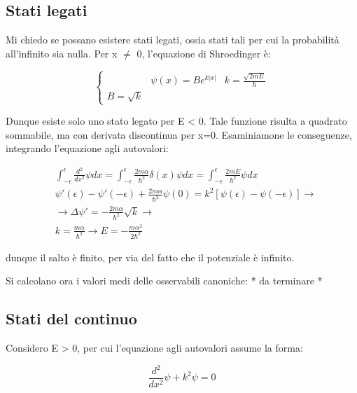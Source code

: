 \documentclass{report}
\begin{document}
\subsection[short]{Stati legati}
Mi chiedo se possano esistere stati legati, ossia stati tali per cui la probabilità all'infinito sia nulla.
Per x $\neq$ 0, l'equazione di Shroedinger è:

\begin{equation}
  \left\{
  \begin{aligned}
     & \psi(x)=Be^{k|x|}
     & k=\frac{\sqrt{2mE}}{\hbar}
    \\ B= \sqrt{k}
  \end{aligned}
  \right.
\end{equation}

Dunque esiste solo uno stato legato per E < 0.
Tale funzione risulta a quadrato sommabile, ma con derivata discontinua per x=0. Esaminiamone le conseguenze, integrando
l'equazione agli autovalori:

\begin{equation}
  \begin{aligned}
     & \int_{-\epsilon}^{\epsilon} \frac{d^2}{dx^2} \psi dx = \int_{-\epsilon}^{\epsilon}\frac{2m\alpha}{\hbar^2}\delta(x)\psi dx= \int_{-\epsilon}^{\epsilon} \frac{2mE}{\hbar^2}\psi dx \\
     & \psi'(\epsilon)-\psi'(-\epsilon)+\frac{2m\alpha}{\hbar^2}\psi(0)=k^2[\psi(\epsilon)- \psi(-\epsilon)] \rightarrow                                                                  \\
     & \rightarrow \Delta \psi'= -\frac{2m\alpha}{\hbar^2}\sqrt{k} \rightarrow                                                                                                            \\
     & k= \frac{m\alpha}{\hbar^2} \rightarrow E=-\frac{m\alpha^2}{2\hbar^2}
  \end{aligned}
\end{equation}

dunque il salto è finito, per via del fatto che il potenziale è infinito.

Si calcolano ora i valori medi delle osservabili canoniche: * da terminare *

\subsection{Stati del continuo}
Considero E > 0, per cui l'equazione agli autovalori assume la forma:

\begin{equation}
  \frac{d^2}{dx^2} \psi+k^2\psi=0
\end{equation}
\end{document}
